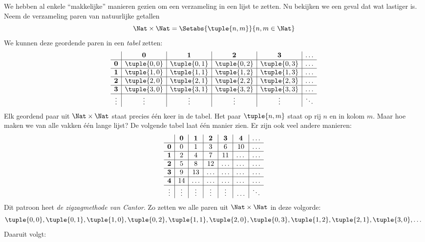 \documentclass[../../../include/open-logic-section]{subfiles}
\begin{document}


\begin{explain}
We hebben al enkele ``makkelijke'' manieren gezien om een verzameling in een
lijst te zetten. Nu bekijken we een geval dat wat lastiger is. Neem de
verzameling paren van natuurlijke getallen
\[
\Nat \times \Nat = \Setabs{\tuple{n,m}}{n,m \in \Nat}
\]
We kunnen deze geordende paren in een \emph{tabel} zetten:
\[
\begin{array}{ c | c | c | c | c | c}
& \mathbf 0 & \mathbf 1 & \mathbf 2 & \mathbf 3 & \dots \\
\hline
\mathbf 0 & \tuple{0,0} & \tuple{0,1} & \tuple{0,2} & \tuple{0,3} & \dots \\
\hline
\mathbf 1 & \tuple{1,0} & \tuple{1,1} & \tuple{1,2} & \tuple{1,3} & \dots \\
\hline
\mathbf 2 & \tuple{2,0} & \tuple{2,1} & \tuple{2,2} & \tuple{2,3} & \dots \\
\hline
\mathbf 3 & \tuple{3,0} & \tuple{3,1} & \tuple{3,2} & \tuple{3,3} & \dots \\
\hline
\vdots & \vdots & \vdots & \vdots & \vdots & \ddots\\
\end{array}
\]
Elk geordend paar uit $\Nat \times \Nat$ staat precies één keer in de tabel.
Het paar $\tuple{n,m}$ staat op rij $n$ en in kolom $m$. Maar hoe maken we van
alle vakken één lange lijst? De volgende tabel laat één manier zien. Er zijn
ook veel andere manieren:
\[
\begin{array}{ c | c | c | c | c | c | c}
& \mathbf 0 & \mathbf 1 & \mathbf 2 & \mathbf 3 & \mathbf 4 &\dots \\
\hline
\mathbf 0 & 0  & 1& 3 & 6& 10 &\ldots \\
\hline
\mathbf 1 &2 & 4& 7 & 11 & \dots &\ldots \\
\hline
\mathbf 2 & 5 & 8 & 12 & \ldots & \dots&\ldots \\
\hline
\mathbf 3 & 9 & 13 & \ldots & \ldots & \dots & \ldots \\
\hline
\mathbf 4 & 14 & \ldots & \ldots & \ldots & \dots & \ldots \\
\hline
\vdots & \vdots & \vdots & \vdots & \vdots&\ldots & \ddots\\
\end{array}
\]\noindent
Dit patroon heet \emph{de zigzagmethode van Cantor}. Zo zetten we alle paren uit
$\Nat \times \Nat$ in deze volgorde:
\[
\tuple{0,0}, \tuple{0,1}, \tuple{1,0}, \tuple{0,2}, \tuple{1,1},
\tuple{2,0}, \tuple{0,3}, \tuple{1,2}, \tuple{2,1}, \tuple{3,0}, \dots
\]
Daaruit volgt:
\end{explain}
\end{document}
